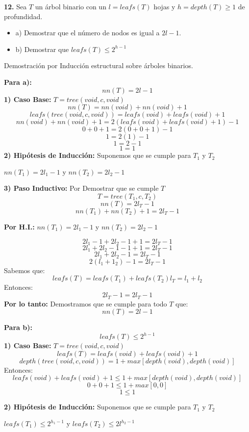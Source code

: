 \textbf{12.} Sea $T$ un árbol binario con un $l = leafs(T)$ hojas y $h = depth(T) \geq 1$ de profundidad.
\begin{itemize}
    \item a) Demostrar que el número de nodos es igual a $2l -1$.
    \item b) Demostrar que $leafs(T) \leq 2^{h -1}$
\end{itemize}
\newline
Demostración por Inducción estructural sobre árboles binarios.
\newline

\textbf{Para a):}
\[
nn(T) = 2l - 1
\]
\textbf{1) Caso Base:} $T = tree(void, c , void)$
\[
nn(T) = nn(void) + nn(void) +1
\]
\[
leafs (tree(void, c , void)) = leafs(void) + leafs(void) + 1
\]
\[
nn(void) + nn(void) +1 = 2(leafs(void) + leafs(void) + 1) - 1
\]
\[
0 + 0 +1 = 2(0 + 0 + 1) - 1
\]
\[
1 = 2(1) - 1
\]
\[
1 = 2 - 1
\]
\[
1 = 1
\]
\textbf{2) Hipótesis de Inducción:} Suponemos que se cumple para $T_{1}$ y $T_{2}$
\begin{center}
    $nn(T_{1}) = 2l_{1} -1$   y     $nn(T_{2}) = 2l_{2} -1$ 
\end{center}

\textbf{3) Paso Inductivo:} Por Demostrar que se cumple  $T$
\[
T = tree(T_{1}, c , T_{2})
\]
\[
nn(T) = 2l_{T} -1
\]
\[
nn(T_{1}) + nn(T_{2}) + 1 = 2l_{T} -1
\]
\begin{center}
    \textbf{Por H.I.:} $nn(T_{1}) = 2l_{1} -1$   y     $nn(T_{2}) = 2l_{2} -1$ 
\end{center}
\[
2l_{1} -1 + 2l_{2} -1 + 1 = 2l_{T} -1
\]
\[
2l_{1} + 2l_{2} -1 -1 + 1 = 2l_{T} -1
\]
\[
2l_{1} + 2l_{2} -1  = 2l_{T} -1
\]
\[
2(l_{1} + 1_{2}) -1  = 2l_{T} -1
\]
Sabemos que: \\
\[
leafs(T) = leafs(T_{1}) + leafs(T_{2})
l_{T} = l_{1} + l_{2}
\]
Entonces: \\
\[
2l_{T} -1 = 2l_{T} -1
\]
\textbf{Por lo tanto:} Demostramos que se cumple para todo $T$ que:
\[
nn(T) = 2l - 1
\]

\newpage 
\textbf{Para b):}
\[
leafs(T) \leq 2^{h -1}
\]
\textbf{1) Caso Base:} $T = tree(void, c , void)$
\[
leafs(T) = leafs(void) + leafs(void) + 1 
\]
\[
depth(tree( void, c, void)) = 1 + max [depth(void), depth(void)]
\]
Entonces:
\[
leafs(void) + leafs(void) + 1 \leq 1 + max [depth(void), depth(void)]
\]
\[
0 + 0 + 1 \leq 1 + max [0, 0]
\]
\[
 1 \leq 1 
\]

\textbf{2) Hipótesis de Inducción:} Suponemos que se cumple para $T_{1}$ y $T_{2}$
\begin{center}
    $leafs(T_{1}) \leq 2^{h_{1}-1}$    y     $leafs(T_{2}) \leq 2l^{h_{2}-1}$ 
\end{center}

